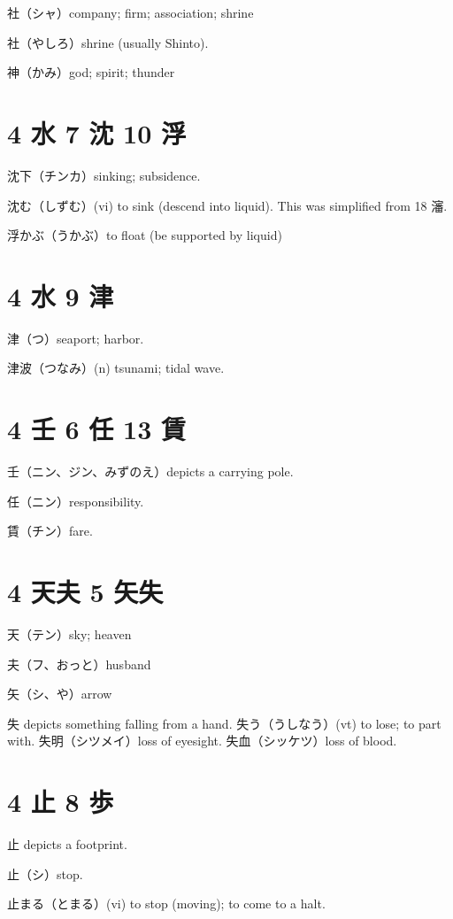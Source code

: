社（シャ）company; firm; association; shrine

社（やしろ）shrine (usually Shinto).

神（かみ）god; spirit; thunder

\section{4 水 7 沈 10 浮}

沈下（チンカ）sinking; subsidence.

沈む（しずむ）(vi) to sink (descend into liquid).
This was simplified from 18 瀋.

浮かぶ（うかぶ）to float (be supported by liquid)

\section{4 水 9 津}

津（つ）seaport; harbor.

津波（つなみ）(n) tsunami; tidal wave.

\section{4 壬 6 任 13 賃}

壬（ニン、ジン、みずのえ）depicts a carrying pole.

任（ニン）responsibility.

賃（チン）fare.

\section{4 天夫 5 矢失}

天（テン）sky; heaven

夫（フ、おっと）husband

矢（シ、や）arrow

失 depicts something falling from a hand.
失う（うしなう）(vt) to lose; to part with.
失明（シツメイ）loss of eyesight.
失血（シッケツ）loss of blood.

\section{4 止 8 歩}

止 depicts a footprint.

止（シ）stop.

止まる（とまる）(vi) to stop (moving); to come to a halt.

